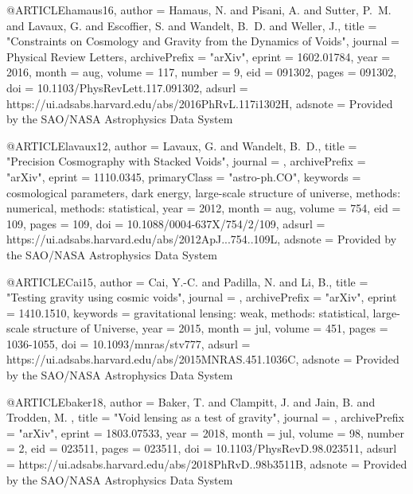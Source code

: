 \documentclass{aa}
\begin{document}
{{{{@ARTICLE{hamaus16,
   author = {{Hamaus}, N. and {Pisani}, A. and {Sutter}, P.~M. and {Lavaux}, G. and 
	{Escoffier}, S. and {Wandelt}, B.~D. and {Weller}, J.},
    title = "{Constraints on Cosmology and Gravity from the Dynamics of Voids}",
  journal = {Physical Review Letters},
archivePrefix = "arXiv",
   eprint = {1602.01784},
     year = 2016,
    month = aug,
   volume = 117,
   number = 9,
      eid = {091302},
    pages = {091302},
      doi = {10.1103/PhysRevLett.117.091302},
   adsurl = {https://ui.adsabs.harvard.edu/abs/2016PhRvL.117i1302H},
  adsnote = {Provided by the SAO/NASA Astrophysics Data System}
}



@ARTICLE{lavaux12,
   author = {{Lavaux}, G. and {Wandelt}, B.~D.},
    title = "{Precision Cosmography with Stacked Voids}",
  journal = {\apj},
archivePrefix = "arXiv",
   eprint = {1110.0345},
 primaryClass = "astro-ph.CO",
 keywords = {cosmological parameters, dark energy, large-scale structure of universe, methods: numerical, methods: statistical},
     year = 2012,
    month = aug,
   volume = 754,
      eid = {109},
    pages = {109},
      doi = {10.1088/0004-637X/754/2/109},
   adsurl = {https://ui.adsabs.harvard.edu/abs/2012ApJ...754..109L},
  adsnote = {Provided by the SAO/NASA Astrophysics Data System}
}



@ARTICLE{Cai15,
   author = {{Cai}, Y.-C. and {Padilla}, N. and {Li}, B.},
    title = "{Testing gravity using cosmic voids}",
  journal = {\mnras},
archivePrefix = "arXiv",
   eprint = {1410.1510},
 keywords = {gravitational lensing: weak, methods: statistical, large-scale structure of Universe},
     year = 2015,
    month = jul,
   volume = 451,
    pages = {1036-1055},
      doi = {10.1093/mnras/stv777},
   adsurl = {https://ui.adsabs.harvard.edu/abs/2015MNRAS.451.1036C},
  adsnote = {Provided by the SAO/NASA Astrophysics Data System}
}


@ARTICLE{baker18,
   author = {{Baker}, T. and {Clampitt}, J. and {Jain}, B. and {Trodden}, M.
	},
    title = "{Void lensing as a test of gravity}",
  journal = {\prd},
archivePrefix = "arXiv",
   eprint = {1803.07533},
     year = 2018,
    month = jul,
   volume = 98,
   number = 2,
      eid = {023511},
    pages = {023511},
      doi = {10.1103/PhysRevD.98.023511},
   adsurl = {https://ui.adsabs.harvard.edu/abs/2018PhRvD..98b3511B},
  adsnote = {Provided by the SAO/NASA Astrophysics Data System}
}

}}}}
\end{document}
